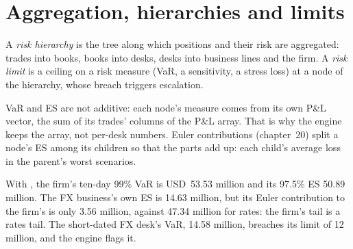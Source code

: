 \label{lst:rc:build-a-risk-engine:plan}

\section{Aggregation, hierarchies and limits}

\begin{definition}\label{def:rc:build-a-risk-engine:hierarchy}
A \emph{risk hierarchy} is the tree along which positions and their risk are
aggregated: trades into books, books into desks, desks into business lines and the firm. A
\emph{risk limit} is a ceiling on a risk measure (VaR, a sensitivity, a stress loss) at a
node of the hierarchy, whose breach triggers escalation.
\end{definition}

VaR and ES are not additive: each node's measure comes from its own P\&L vector, the sum of its trades'
columns of the P\&L array. That is why the engine keeps the array, not per-desk numbers. Euler contributions
(chapter~20) split a node's ES among its children so that the parts add up: each child's average loss in the
parent's worst scenarios.

\begin{example}\label{ex:rc:build-a-risk-engine:report}
With , the firm's ten-day 99\% VaR is USD~53.53 million and its 97.5\% ES 50.89 million.
The FX business's own ES is 14.63 million, but its Euler contribution to the firm's is only 3.56 million,
against 47.34 million for rates: the firm's tail is a rates tail. The short-dated FX desk's VaR, 14.58 million,
breaches its limit of 12 million, and the engine flags it.
\end{example}

\label{lst:rc:build-a-risk-engine:kernel}

